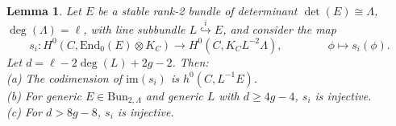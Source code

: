 \documentclass[twoside, 11pt]{article}
\numberwithin{equation}{section}
\theoremstyle{theorem}
\numberwithin{theorem}{section}
\newtheorem{lemma}[lemma]{Lemma}
\theoremstyle{definition}
\begin{document}
\begin{lemma}\label{lemma-im-s_i}
Let $E$ be a stable rank-2 bundle of determinant $\det(E) \cong \Lambda$, $\deg(\Lambda) = \ell$, with line subbundle $L \overset{i}{\hookrightarrow} E$, and consider the map 
\begin{equation}\label{s_i}
s_i: H^0(C, \mathrm{End}_0(E) \otimes K_C) \longrightarrow H^0(C, K_C L^{-2}\Lambda), 
\qquad \qquad \phi \longmapsto s_i(\phi).     
\end{equation}
Let $d = \ell - 2\deg(L) + 2g-2$. Then: \\
(a) The codimension of $\mathrm{im}(s_i)$ is $h^0(C, L^{-1}E)$. \\
(b) For generic $E \in \mathrm{Bun}_{2, \Lambda}$ and generic $L$ with $d\geq 4g-4$, $s_i$ is injective. \\
(c) For $d > 8g-8$, $s_i$ is injective.
\end{lemma}
\end{document}
